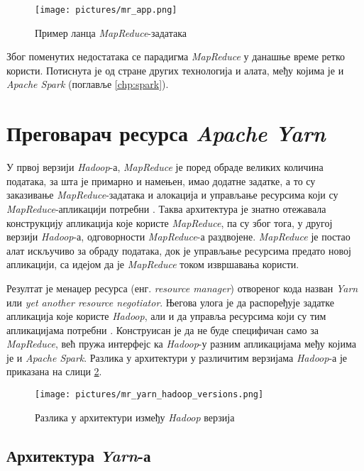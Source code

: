 \documentclass[12pt,oneside]{memoir}
\begin{document}
\begin{figure}[!ht]
  \centering
  \texttt{[image: pictures/mr\_app.png]}
  \caption{Пример ланца \textit{MapReduce}-задатака}
  \label{fig:mr_app_example}
\end{figure}

Због поменутих недостатака се парадигма \textit{MapReduce} у данашње време ретко користи. Потиснута је од стране других технологија и алата, међу којима је и \textit{Apache Spark}  (поглавље \ref{chp:spark}).

\section{Преговарач ресурса \textit{Apache Yarn}}
\label{sec:yarn}

У првој верзији \textit{Hadoop}-а, \textit{MapReduce} је поред обраде великих количина података, за шта је примарно и намењен, имао додатне задатке, а то су заказивање \textit{MapReduce}-задатака и алокација и управљање ресурсима који су \textit{MapReduce}-апликацији потребни \cite{hadoop_learning}. Таква архитектура је знатно отежавала конструкцију апликација које користе \textit{MapReduce}, па су због тога, у другој верзији \textit{Hadoop}-а, одговорности \textit{MapReduce}-а раздвојене. \textit{MapReduce} је постао алат искључиво за обраду података, док је управљање ресурсима предато новој апликацији, са идејом да је \textit{MapReduce} током извршавања користи.

Резултат је менаџер ресурса (енг. \textit{resource manager}) отвореног кода назван \textit{Yarn} \cite{yarn} или \textit{yet another resource negotiator}. Његова улога је да распоређује задатке апликација које користе \textit{Hadoop}, али и да управља ресурсима који су тим апликацијама потребни  \cite{hadoop_learning}. Конструисан је да не буде специфичан само за \textit{MapReduce}, већ пружа интерфејс ка \textit{Hadoop}-у разним апликацијама међу којима је и \textit{Apache Spark}. Разлика у архитектури у различитим верзијама \textit{Hadoop}-а је приказана на слици \ref{fig:yarn_hadoop_versions}.

\begin{figure}[!ht]
  \centering
  \texttt{[image: pictures/mr\_yarn\_hadoop\_versions.png]}
  \caption{Разлика у архитектури између \textit{Hadoop} верзија}
  \label{fig:yarn_hadoop_versions}
\end{figure}

\subsection{Архитектура \textit{Yarn}-а}
\label{subsec:yern_arch}
\end{document}
